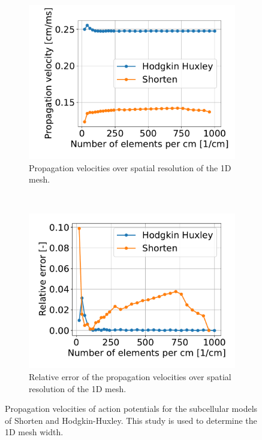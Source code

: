 \begin{figure}%
  \centering%
  \begin{subfigure}[t]{0.45\textwidth}%
    \centering%
    \includegraphics[width=\textwidth]{images/results/studies/propagation_velocity.pdf}%
    \caption{Propagation velocities over spatial resolution of the 1D mesh.}%
    \label{fig:propagation_velocity_comparison}%
  \end{subfigure}
  \,
  \begin{subfigure}[t]{0.45\textwidth}%
    \centering%
    \includegraphics[width=\textwidth]{images/results/studies/propagation_velocity_rel_error.pdf}%
    \caption{Relative error of the propagation velocities over spatial resolution of the 1D mesh.}%
    \label{fig:propagation_velocity_rel_error}%
  \end{subfigure}   
  \caption{Propagation velocities of action potentials for the subcellular models of Shorten and Hodgkin-Huxley. This study is used to determine the 1D mesh width.}%
  \label{fig:propagation_velocity}%
\end{figure}%



